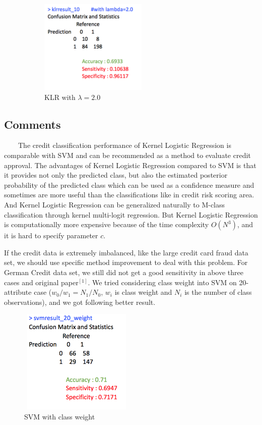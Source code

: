 \documentclass[11pt, oneside]{article}   	%
\begin{document}
\begin{figure}[h]
\begin{subfigure}[b]{0.475\textwidth}
            \centering
            \includegraphics[width=\textwidth, height=4.5cm]{klr_10}
            \caption{\small KLR with $\lambda=2.0$}\label{klr_10}
        \end{subfigure}
       \caption{}
\end{figure}



\subsection{Comments}
~~~~The credit classification performance of Kernel Logistic Regression is comparable with SVM and can be recommended as a method to evaluate credit approval. The advantages of Kernel Logistic Regression compared to SVM is that it provides not only the predicted class, but also the estimated posterior probability of the predicted class which can be used as a confidence measure and sometimes are more useful than the classifications like in credit risk scoring area. And Kernel Logistic Regression can be generalized naturally to M-class classification through kernel multi-logit regression. But Kernel Logistic Regression is computationally more expensive because of the time complexity $O(N^{3})$, and it is hard to specify parameter $c$.

\vspace{6pt}
If the credit data is extremely imbalanced, like the large credit card fraud data set, we should use specific method improvement to deal with this problem. For German Credit data set, we still did not get a good sensitivity in above three cases and original paper$^{[1]}$. We tried considering class weight into SVM on 20-attribute case ($w_0/w_1=N_1/N_0$, $w_i$ is class weight and $N_i$ is the number of class observations), and we got following better result.

\begin{figure}[H]
        \centering
         \includegraphics[width=5.5cm,height=5cm]{svm_20_w}
         \caption{\normalsize SVM with class weight }\label{svm_20_w}
\end{figure}
\end{document}
